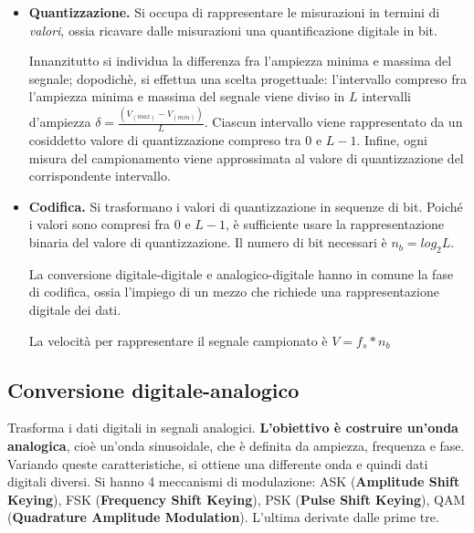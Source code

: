 \begin{itemize}
                \item
                    \textbf{Quantizzazione.} Si occupa di rappresentare le misurazioni in termini di \textit{valori}, ossia ricavare dalle misurazioni una quantificazione digitale in bit.
                    
                    Innanzitutto si individua la differenza fra l'ampiezza minima e massima del segnale; dopodichè, si effettua una scelta progettuale: l'intervallo compreso fra l'ampiezza minima e massima del segnale viene diviso in $L$ intervalli d'ampiezza $\delta = \frac{(V_(max) - V_(min))}{L}$. Ciascun intervallo viene rappresentato da un cosiddetto valore di quantizzazione compreso tra $0$ e $L-1$. Infine, ogni misura del campionamento viene approssimata al valore di quantizzazione del corrispondente intervallo.
                
                \item
                    \textbf{Codifica.} Si trasformano i valori di quantizzazione in sequenze di bit. Poiché i valori sono compresi fra $0$ e $L-1$, è sufficiente usare la rappresentazione binaria del valore di quantizzazione. Il numero di bit necessari è $n_b = log_2 L$.
                    
                     La conversione digitale-digitale e analogico-digitale hanno in comune la fase di codifica, ossia l'impiego di un mezzo che richiede una rappresentazione digitale dei dati.
                    
                    La velocità per rappresentare il segnale campionato è $V = f_s * n_b$
            \end{itemize}
            
    \subsection{Conversione digitale-analogico}
    
        Trasforma i dati digitali in segnali analogici. \textbf{L'obiettivo è costruire un'onda analogica}, cioè un'onda sinusoidale, che è definita da ampiezza, frequenza e fase. Variando queste caratteristiche, si ottiene una differente onda e quindi dati digitali diversi. Si hanno 4 meccanismi di modulazione: ASK (\textbf{Amplitude Shift Keying}), FSK (\textbf{Frequency Shift Keying}), PSK (\textbf{Pulse Shift Keying}), QAM (\textbf{Quadrature Amplitude Modulation}). L'ultima derivate dalle prime tre.
        
        \vspace{3mm}
        
